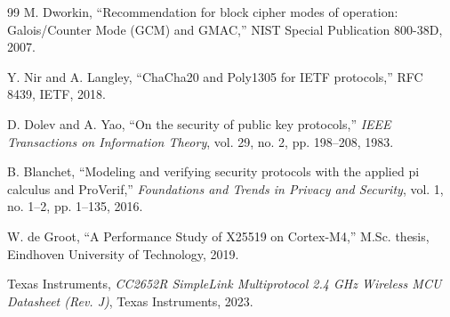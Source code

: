 \documentclass[journal]{IEEEtran}
\begin{document}
\begin{thebibliography}{99}
M. Dworkin,
``Recommendation for block cipher modes of operation: Galois/Counter Mode (GCM) and GMAC,''
NIST Special Publication 800-38D, 2007.

Y. Nir and A. Langley,
``ChaCha20 and Poly1305 for IETF protocols,''
RFC 8439, IETF, 2018.

D. Dolev and A. Yao,
``On the security of public key protocols,''
\emph{IEEE Transactions on Information Theory}, vol. 29, no. 2, pp. 198--208, 1983.

B. Blanchet,
``Modeling and verifying security protocols with the applied pi calculus and ProVerif,''
\emph{Foundations and Trends in Privacy and Security}, vol. 1, no. 1--2, pp. 1--135, 2016.

W. de Groot,
``A Performance Study of X25519 on Cortex-M4,''
M.Sc. thesis, Eindhoven University of Technology, 2019.

Texas Instruments,
\emph{CC2652R SimpleLink Multiprotocol 2.4 GHz Wireless MCU Datasheet (Rev. J)},
Texas Instruments, 2023.

\end{thebibliography}
\end{document}
